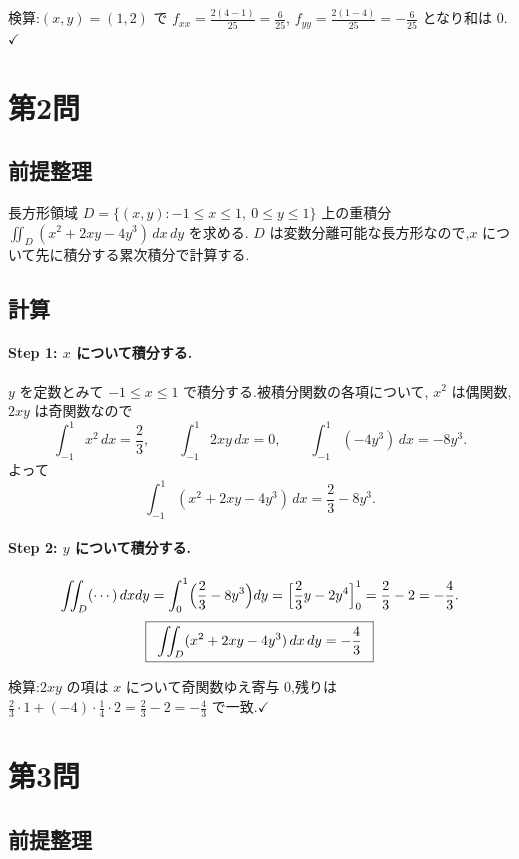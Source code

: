 \documentclass[11pt,a4paper]{article}
\begin{document}
検算:$(x,y)=(1,2)$ で $f_{xx}=\frac{2(4-1)}{25}=\frac{6}{25}$,
$f_{yy}=\frac{2(1-4)}{25}=-\frac{6}{25}$ となり和は $0$.$\checkmark$

\section*{第2問}

\subsection*{前提整理}

長方形領域 $D=\{(x,y):-1\le x\le1,\ 0\le y\le1\}$ 上の重積分
$\displaystyle\iint_D (x^2+2xy-4y^3)\,dx\,dy$ を求める.
$D$ は変数分離可能な長方形なので,$x$ について先に積分する累次積分で計算する.

\subsection*{計算}

\paragraph{Step 1: $x$ について積分する.}
$y$ を定数とみて $-1\le x\le1$ で積分する.被積分関数の各項について,
$x^2$ は偶関数,$2xy$ は奇関数なので
\[
\int_{-1}^{1}x^2\,dx=\frac23,\qquad
\int_{-1}^{1}2xy\,dx=0,\qquad
\int_{-1}^{1}(-4y^3)\,dx=-8y^3.
\]
よって
\[
\int_{-1}^{1}(x^2+2xy-4y^3)\,dx=\frac23-8y^3.
\]

\paragraph{Step 2: $y$ について積分する.}
\[
\iint_D(\cdots)\,dxdy=\int_0^1\Bigl(\frac23-8y^3\Bigr)dy
=\Bigl[\frac23 y-2y^4\Bigr]_0^1=\frac23-2=-\frac43.
\]
\[
\boxed{\,\
\displaystyle\iint_D (x^2+2xy-4y^3)\,dx\,dy=-\frac{4}{3}\ \,}
\]

検算:$2xy$ の項は $x$ について奇関数ゆえ寄与 $0$,残りは
$\frac23\cdot1+(-4)\cdot\frac14\cdot2=\frac23-2=-\frac43$ で一致.$\checkmark$

\section*{第3問}

\subsection*{前提整理}
\end{document}

